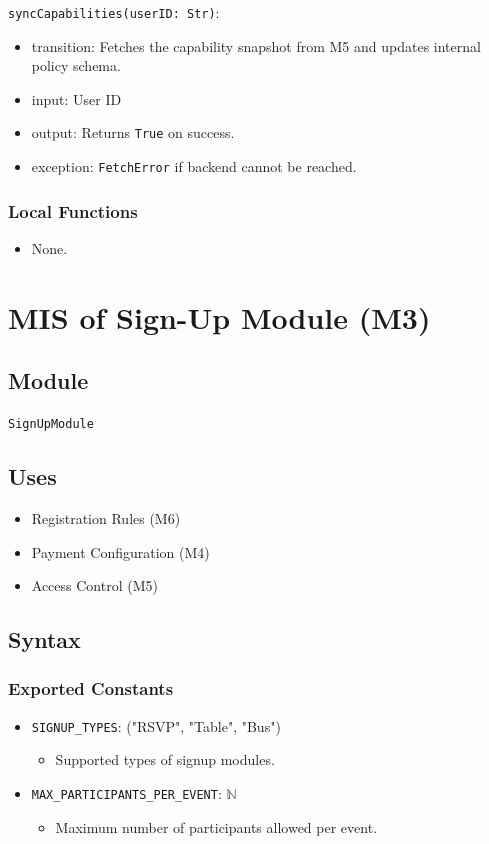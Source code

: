 \documentclass[12pt, titlepage]{article}
\begin{document}
\noindent \texttt{syncCapabilities(userID: Str)}:
\begin{itemize}
\item transition: Fetches the capability snapshot from M5 and updates internal policy schema.
\item input: User ID
\item output: Returns \texttt{True} on success.
\item exception: \texttt{FetchError} if backend cannot be reached.
\end{itemize}

\subsubsection{Local Functions}

\begin{itemize}
    \item None.
\end{itemize}

\section{MIS of Sign-Up Module (M3)} \label{MIS_M3}

\subsection{Module}

\texttt{SignUpModule}\\

\subsection{Uses}
\begin{itemize}
    \item Registration Rules (M6)
    \item Payment Configuration (M4)
    \item Access Control (M5)
\end{itemize}

\subsection{Syntax}

\subsubsection{Exported Constants}
\begin{itemize}
    \item \texttt{SIGNUP\_TYPES}: ("RSVP", "Table", "Bus")
    \begin{itemize}
        \item Supported types of signup modules.
    \end{itemize}

    \item \texttt{MAX\_PARTICIPANTS\_PER\_EVENT}: $\mathbb{N}$
    \begin{itemize}
        \item Maximum number of participants allowed per event.
    \end{itemize}
\end{itemize}
\end{document}
